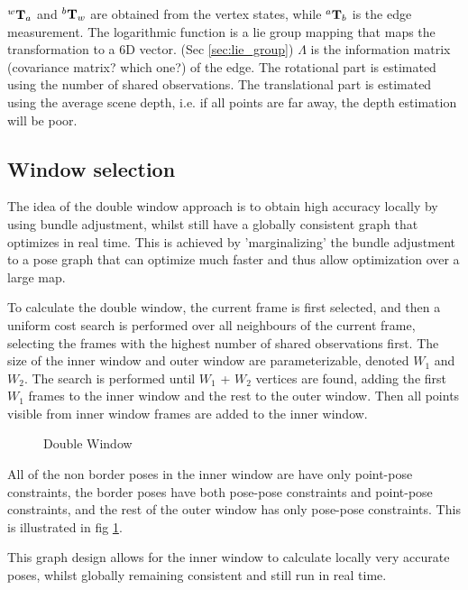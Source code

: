 $^{w}\mathbf T_{a}$ and $^{b} \mathbf T_{w}$ are obtained from the vertex states, while $^{a} \mathbf T_{b}$ is the edge measurement.  The logarithmic function is a lie group mapping that maps the transformation to a 6D vector. (Sec \ref{sec:lie_group})  $\Lambda$ is the information matrix (covariance matrix? which one?) of the edge.  The rotational part is estimated using the number of shared observations.  The translational part is estimated using the average scene depth, i.e. if all points are far away, the depth estimation will be poor.

\subsection{Window selection}

The idea of the double window approach is to obtain high accuracy locally by using bundle adjustment, whilst still have a globally consistent graph that optimizes in real time.  This is achieved by 'marginalizing' the bundle adjustment to a pose graph that can optimize much faster and thus allow optimization over a large map.

To calculate the double window, the current frame is first selected, and then a uniform cost search is performed over all neighbours of the current frame, selecting the frames with the highest number of shared observations first. The size of the inner window and outer window are parameterizable, denoted $W_1$ and $W_2$. The search is performed until $W_1$ + $W_2$ vertices are found, adding the first $W_1$ frames to the inner window and the rest to the outer window. Then all points visible from inner window frames are added to the inner window.  

\begin{figure}[h!]
  \centering
  \caption{Double Window}
  \label{fig:double_window}
\end{figure}

All of the non border poses in the inner window are have only point-pose constraints, the border poses have both pose-pose constraints and point-pose constraints, and the rest of the outer window has only pose-pose constraints.  This is illustrated in fig \ref{fig:double_window}.  

This graph design allows for the inner window to calculate locally very accurate poses, whilst globally remaining consistent and still run in real time.

